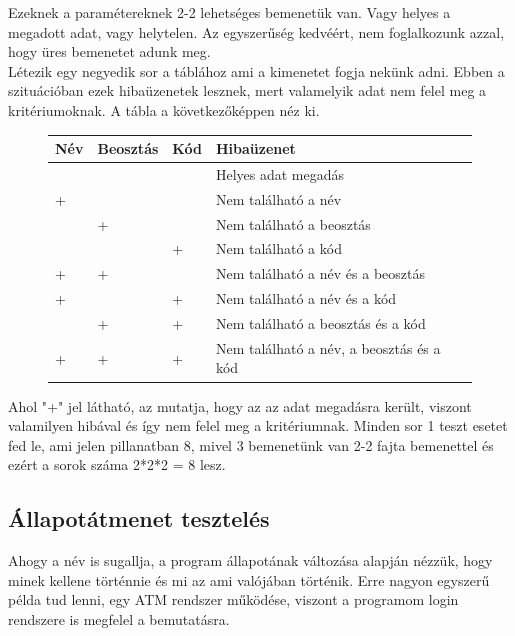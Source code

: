 Ezeknek a paramétereknek 2-2 lehetséges bemenetük van. Vagy helyes a megadott adat, vagy helytelen. Az egyszerűség kedvéért, nem foglalkozunk azzal, hogy üres bemenetet adunk meg.\\

Létezik egy negyedik sor a táblához ami a kimenetet fogja nekünk adni. Ebben a szituációban ezek hibaüzenetek lesznek, mert valamelyik adat nem felel meg a kritériumoknak. A tábla a következőképpen néz ki.

\begin{figure} [h]
	\begin{center}
		\begin{tabular}{| p{2cm} | p{2cm} | p{2cm} | p{5cm} |}
			\hline
			Név & Beosztás & Kód & Hibaüzenet\\
			\hline
			& & & Helyes adat megadás\\
			\hline
			+ & & & Nem található a név\\
			\hline
			& + & & Nem található a beosztás\\
			\hline
			&  & + & Nem található a kód\\
			\hline
			+ & + & & Nem található a név és a beosztás\\
			\hline
			+ & & + & Nem található a név és a kód\\
			\hline
			& + &  +& Nem található a beosztás és a kód\\
			\hline
			+ & + & + & Nem található a név, a beosztás és a kód\\
			\hline
		\end{tabular}
	\end{center}
\end{figure}

Ahol "+" jel látható, az mutatja, hogy az az adat megadásra került, viszont valamilyen hibával és így nem felel meg a kritériumnak. Minden sor 1 teszt esetet fed le, ami jelen pillanatban 8, mivel 3 bemenetünk van 2-2 fajta bemenettel és ezért a sorok száma 2*2*2 = 8 lesz.

\subsection{Állapotátmenet tesztelés} Ahogy a név is sugallja, a program állapotának változása alapján nézzük, hogy minek kellene történnie és mi az ami valójában történik. Erre nagyon egyszerű példa tud lenni, egy ATM rendszer működése, viszont a programom login rendszere is megfelel a bemutatásra. \\

